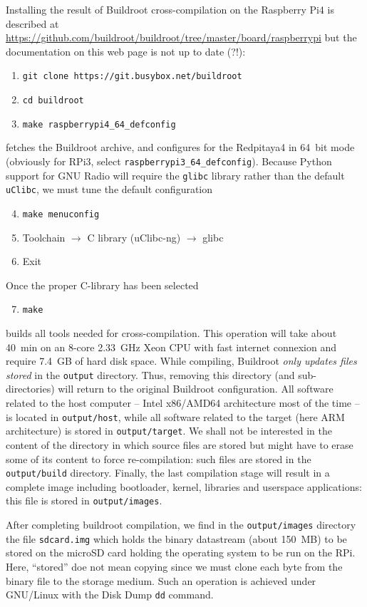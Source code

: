 \documentclass[a4paper]{article}
\begin{document}
Installing the result of Buildroot cross-compilation on the Raspberry Pi4 is 
described at \url{https://github.com/buildroot/buildroot/tree/master/board/raspberrypi} but
the documentation on this web page is not up to date (?!):
\begin{enumerate}
\item {\tt git clone https://git.busybox.net/buildroot}
\item {\tt cd buildroot}
\item {\tt make raspberrypi4\_64\_defconfig}
\end{enumerate}
fetches the Buildroot archive, and configures for the Redpitaya4 in 64~bit mode (obviously
for RPi3, select {\tt raspberrypi3\_64\_defconfig}).
Because Python support for GNU Radio will require the {\tt glibc} library rather than the default
{\tt uClibc}, we must tune the default configuration
\begin{enumerate}
\setcounter{enumi}{3}
\item {\tt make menuconfig}
\item Toolchain $\rightarrow$ C library (uClibc-ng) $\rightarrow$ glibc
\item Exit
\end{enumerate}

Once the proper C-library has been selected
\begin{enumerate}
\setcounter{enumi}{6}
\item {\tt make}
\end{enumerate}
builds all tools
needed for cross-compilation. This operation will take about 40~min on an 8-core 2.33~GHz Xeon 
CPU with fast internet connexion and require 7.4~GB of hard disk space. While compiling, 
Buildroot {\em only updates files stored} in the 
{\tt output} directory. Thus, removing this directory (and sub-directories) will return to
the original Buildroot configuration. All software related to the host computer -- Intel x86/AMD64
architecture most of the time -- is located in {\tt output/host}, while all software related
to the target (here ARM architecture) is stored in {\tt output/target}. We shall not be
interested in the content of the directory in which source files are stored but might have
to erase some of its content to force re-compilation: such files are stored in the {\tt output/build}
directory. Finally, the last compilation stage will result in a complete image including bootloader,
kernel, libraries and userspace applications: this file is stored in {\tt output/images}.

After completing buildroot compilation, we find in the {\tt output/images} directory 
the file {\tt sdcard.img} which 
holds the binary datastream (about 150~MB) to be stored on the microSD card holding the 
operating system to 
be run on the RPi. Here, ``stored'' doe not mean copying since we must clone each byte from 
the binary file to the storage medium. Such an operation is achieved under GNU/Linux with the
Disk Dump {\tt dd} command.
\end{document}
